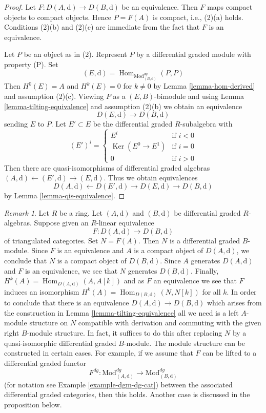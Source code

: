 \documentclass{stacks-project}
\theoremstyle{plain}
\theoremstyle{definition}
\theoremstyle{remark}
\newtheorem{remark}[subsection]{Remark}
\numberwithin{equation}{subsection}
\def\Hom{\mathop{\mathrm{Hom}}\nolimits}
\def\Ker{\mathop{\mathrm{Ker}}}
\begin{document}
\begin{proof}
Let $F : D(A, \text{d}) \to D(B, \text{d})$ be an equivalence.
Then $F$ maps compact objects to compact objects. Hence $P = F(A)$ is
compact, i.e., (2)(a) holds. Conditions (2)(b) and (2)(c) are immediate
from the fact that $F$ is an equivalence.

\medskip\noindent
Let $P$ be an object as in (2). Represent $P$ by a
differential graded module with property (P). Set
$$
(E, \text{d}) = \Hom_{\text{Mod}^{dg}_{(B, \text{d})}}(P, P)
$$
Then $H^0(E) = A$ and $H^k(E) = 0$ for $k \not = 0$ by
Lemma \ref{lemma-hom-derived} and assumption (2)(c).
Viewing $P$ as a $(E, B)$-bimodule and using
Lemma \ref{lemma-tilting-equivalence} and assumption (2)(b)
we obtain an equivalence
$$
D(E, \text{d}) \to D(B, \text{d})
$$
sending $E$ to $P$.
Let $E' \subset E$ be the differential graded $R$-subalgebra
with
$$
(E')^i = \left\{
\begin{matrix}
E^i & \text{if }i < 0 \\
\Ker(E^0 \to E^1) & \text{if }i = 0 \\
0 & \text{if }i > 0
\end{matrix}
\right.
$$
Then there are quasi-isomorphisms of differential graded
algebras $(A, \text{d}) \leftarrow (E', \text{d}) \rightarrow (E, \text{d})$.
Thus we obtain equivalences
$$
D(A, \text{d}) \leftarrow D(E', \text{d}) \rightarrow D(E, \text{d})
\rightarrow D(B, \text{d})
$$
by Lemma \ref{lemma-qis-equivalence}.
\end{proof}

\begin{remark}
\label{remark-lift-equivalence-to-dga}
Let $R$ be a ring. Let $(A, \text{d})$ and $(B, \text{d})$ be differential
graded $R$-algebras. Suppose given an $R$-linear equivalence
$$
F : D(A, \text{d}) \longrightarrow D(B, \text{d})
$$
of triangulated categories. Set $N = F(A)$. Then $N$ is a differential
graded $B$-module. Since $F$ is an equivalence and $A$ is a compact
object of $D(A, \text{d})$, we conclude that $N$ is a compact object
of $D(B, \text{d})$. Since $A$ generates $D(A, \text{d})$ and
$F$ is an equivalence, we see that $N$ generates $D(B, \text{d})$.
Finally, $H^k(A) = \Hom_{D(A, \text{d})}(A, A[k])$ and as $F$ an equivalence
we see that $F$ induces an isomorphism
$H^k(A) = \Hom_{D(B, \text{d})}(N, N[k])$ for all $k$.
In order to conclude that there is an equivalence
$D(A, \text{d}) \longrightarrow D(B, \text{d})$ which
arises from the construction in
Lemma \ref{lemma-tilting-equivalence}
all we need is a left $A$-module structure on $N$
compatible with derivation and commuting
with the given right $B$-module structure. In fact, it
suffices to do this after replacing $N$ by a quasi-isomorphic
differential graded $B$-module.
The module structure can be constructed in certain cases.
For example, if we assume that $F$ can be lifted to a
differential graded functor
$$
F^{dg} :
\text{Mod}^{dg}_{(A, \text{d})}
\longrightarrow
\text{Mod}^{dg}_{(B, \text{d})}
$$
(for notation see Example \ref{example-dgm-dg-cat})
between the associated differential graded categories,
then this holds. Another case is discussed in the proposition below.
\end{remark}
\end{document}

